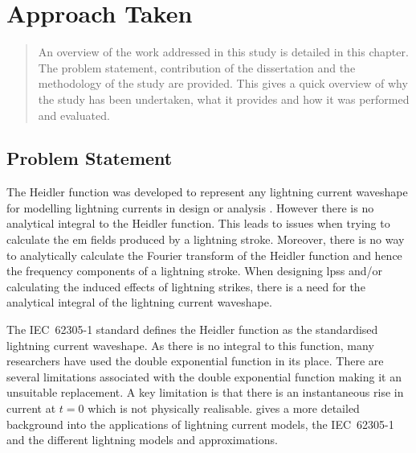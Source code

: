 
\chapter{Approach Taken} %

\label{ChapterApproach} %

\begin{quote}
An overview of the work addressed in this study is detailed in this chapter. The problem statement, contribution of the dissertation and the methodology of the study are provided. This gives a quick overview of why the study has been undertaken, what it provides and how it was performed and evaluated.
\end{quote}


\section{Problem Statement}
\label{sec:approach_problem_statement}
The Heidler function was developed to represent any lightning current waveshape for modelling lightning currents in design or analysis \cite{Heidler2002}. However there is no analytical integral to the Heidler function. This leads to issues when trying to calculate the \gls{em} fields produced by a lightning stroke. Moreover, there is no way to analytically calculate the Fourier transform of the Heidler function and hence the frequency components of a lightning stroke. When designing \glspl{lps} and/or calculating the induced effects of lightning strikes, there is a need for the analytical integral of the lightning current waveshape.

The IEC~62305-1 standard defines the Heidler function as the standardised lightning current waveshape. As there is no integral to this function, many researchers have used the double exponential function in its place. There are several limitations associated with the double exponential function making it an unsuitable replacement. A key limitation is that there is an instantaneous rise in current at $t=0$ which is not physically realisable.  gives a more detailed background into the applications of lightning current models, the IEC~62305-1 and the different lightning models and approximations.

